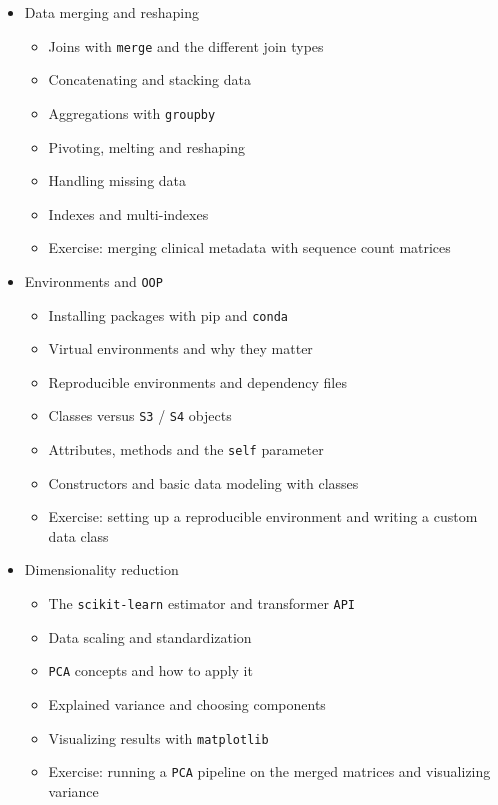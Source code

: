 \documentclass[
]{article}
\providecommand{\tightlist}{%
  \setlength{\itemsep}{0pt}\setlength{\parskip}{0pt}}
\begin{document}
\begin{itemize}
\tightlist
\item
  Data merging and reshaping

  \begin{itemize}
  \tightlist
  \item
    Joins with \texttt{merge} and the different join types
  \item
    Concatenating and stacking data
  \item
    Aggregations with \texttt{groupby}
  \item
    Pivoting, melting and reshaping
  \item
    Handling missing data
  \item
    Indexes and multi-indexes
  \item
    Exercise: merging clinical metadata with sequence count matrices
  \end{itemize}
\end{itemize}

\begin{itemize}
\tightlist
\item
  Environments and \texttt{OOP}

  \begin{itemize}
  \tightlist
  \item
    Installing packages with pip and \texttt{conda}
  \item
    Virtual environments and why they matter
  \item
    Reproducible environments and dependency files
  \item
    Classes versus \texttt{S3} / \texttt{S4} objects
  \item
    Attributes, methods and the \texttt{self} parameter
  \item
    Constructors and basic data modeling with classes
  \item
    Exercise: setting up a reproducible environment and writing a custom
    data class
  \end{itemize}
\end{itemize}

\begin{itemize}
\tightlist
\item
  Dimensionality reduction

  \begin{itemize}
  \tightlist
  \item
    The \texttt{scikit-learn} estimator and transformer \texttt{API}
  \item
    Data scaling and standardization
  \item
    \texttt{PCA} concepts and how to apply it
  \item
    Explained variance and choosing components
  \item
    Visualizing results with \texttt{matplotlib}
  \item
    Exercise: running a \texttt{PCA} pipeline on the merged matrices and
    visualizing variance
  \end{itemize}
\end{itemize}
\end{document}
